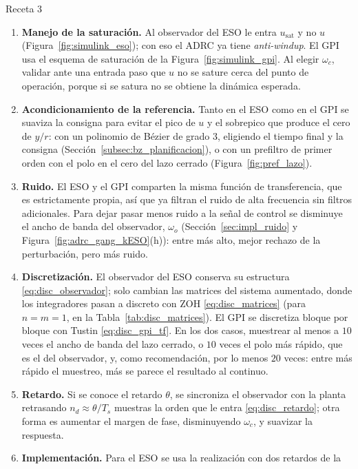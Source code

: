 \begin{recuadro}{Receta 3}
\begin{enumerate}\setlength{\itemsep}{2pt}
  \item \textbf{Manejo de la saturación.} Al observador del ESO le entra
  $u_{\mathrm{sat}}$ y no $u$ (Figura~\ref{fig:simulink_eso}); con eso el ADRC ya tiene
  \emph{anti-windup}. El GPI usa el esquema de saturación de la
  Figura~\ref{fig:simulink_gpi}. Al elegir $\omega_c$, validar ante una entrada paso que $u$ no se
  sature cerca del punto de operación, porque si se satura no se obtiene la dinámica esperada.
  \item \textbf{Acondicionamiento de la referencia.} Tanto en el ESO como en el GPI se suaviza la
  consigna para evitar el pico de $u$ y el sobrepico que produce el cero de $y/r$: con un polinomio de
  Bézier de grado $3$, eligiendo el tiempo final y la consigna (Sección~\ref{subsec:bz_planificacion}),
  o con un prefiltro de primer orden con el polo en el cero del lazo cerrado
  (Figura~\ref{fig:pref_lazo}).
  \item \textbf{Ruido.} El ESO y el GPI comparten la misma función de transferencia, que es
  estrictamente propia, así que ya filtran el ruido de alta frecuencia sin filtros adicionales. Para
  dejar pasar menos ruido a la señal de control se disminuye el ancho de banda del observador, $\omega_o$
  (Sección~\ref{sec:impl_ruido} y Figura~\ref{fig:adrc_gang_kESO}(h)): entre más alto, mejor rechazo
  de la perturbación, pero más ruido.
  \item \textbf{Discretización.} El observador del ESO conserva su estructura
  \eqref{eq:disc_observador}; solo cambian las matrices del sistema aumentado, donde los integradores
  pasan a discreto con ZOH \eqref{eq:disc_matrices} (para $n = m = 1$, en la
  Tabla~\ref{tab:disc_matrices}). El GPI se discretiza bloque por bloque con Tustin
  \eqref{eq:disc_gpi_tf}. En los dos casos, muestrear al menos a $10$ veces el ancho de banda del lazo
  cerrado, o $10$ veces el polo más rápido, que es el del observador, y, como recomendación, por lo menos $20$ veces: entre más
  rápido el muestreo, más se parece el resultado al continuo.
  \item \textbf{Retardo.} Si se conoce el retardo $\theta$, se sincroniza el observador con la planta
  retrasando $n_d \approx \theta/T_s$ muestras la orden que le entra \eqref{eq:disc_retardo}; otra forma es aumentar el margen
  de fase, disminuyendo $\omega_c$, y suavizar la respuesta.
  \item \textbf{Implementación.} Para el ESO se usa la realización con dos retardos de la

\end{enumerate}
\end{recuadro}
